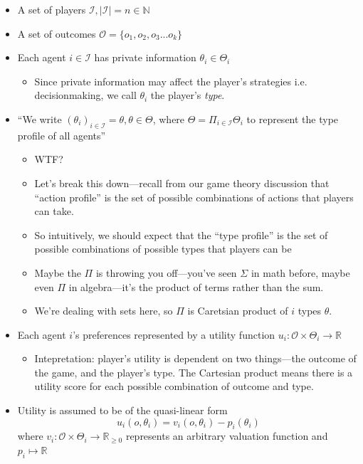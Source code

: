 \documentclass[11pt]{article}
\begin{document}
\begin{itemize}
    \item A set of players $\mathcal{I}, |\mathcal{I}| = n \in \mathbb{N}$
    \item A set of outcomes $\mathcal{O} = \{o_1, o_2, o_3...o_k\}$
    \item Each agent $i \in \mathcal{I}$ has private information $\theta_i \in \Theta_i$
    \begin{itemize}
        \item Since private information may affect the player's strategies i.e. decisionmaking, we call $\theta_i$ the player's {\it type}.
    \end{itemize}
    \item ``We write $(\theta_i)_{i \in \mathcal{I}} = \theta, \theta \in \Theta$, where $\Theta = \Pi_{i\in \mathcal{I}}\Theta_i$ to represent the type profile of all agents''
    \begin{itemize}
        \item WTF?
        \item Let's break this down---recall from our game theory discussion that ``action profile'' is the set of possible combinations of actions that players can take.
        \item So intuitively, we should expect that the ``type profile'' is the set of possible combinations of possible types that players can be
        \item Maybe the $\Pi$ is throwing you off---you've seen $\Sigma$ in math before, maybe even $\Pi$ in algebra---it's the product of terms rather than the sum. 
        \item We're dealing with sets here, so $\Pi$ is Caretsian product of $i$ types $\theta$.
    \end{itemize}
    \item Each agent $i$'s preferences represented by a utility function $u_i : \mathcal{O} \times \Theta_i \rightarrow \mathbb{R}$
    \begin{itemize}
        \item Intepretation: player's utility is dependent on two things---the outcome of the game, and the player's type. The Cartesian product means there is a utility score for each possible combination of outcome and type.
    \end{itemize}
    \item Utility is assumed to be of the quasi-linear form $$u_i(o, \theta_i) = v_i(o, \theta_i) - p_i(\theta_i)$$ where $v_i : \mathcal{O} \times \Theta_i \rightarrow \mathbb{R}_{\geq 0}$ represents an arbitrary valuation function and $p_i \mapsto \mathbb{R}$ 

\end{itemize}
\end{document}
